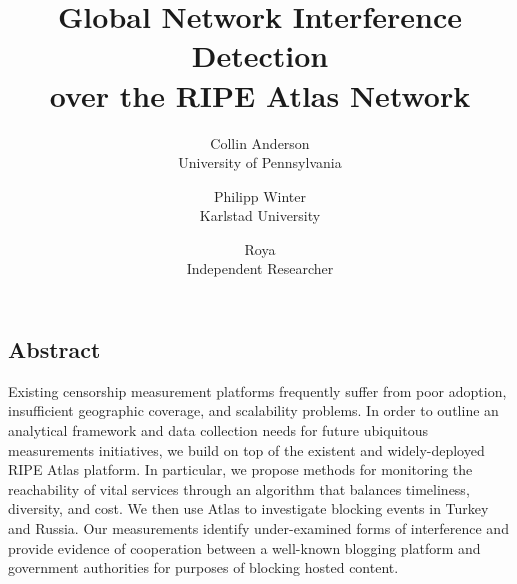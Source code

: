 \documentclass[letterpaper,twocolumn,10pt]{article}
\begin{document}
\date{}

\title{
	\Large \bf Global Network Interference Detection \\
	over the RIPE Atlas Network
}

\author{
	{\rm Collin Anderson} \\
	University of Pennsylvania
	\and
	{\rm Philipp Winter} \\
	Karlstad University
	\and
	{\rm Roya} \\
	Independent Researcher
}

\maketitle

\thispagestyle{empty}

\subsection*{Abstract}

Existing censorship measurement platforms frequently suffer from poor
adoption, insufficient geographic coverage, and scalability problems. In
order to outline an analytical framework and data collection needs for
future ubiquitous measurements initiatives, we build on top of the
existent and widely-deployed RIPE Atlas platform. In particular, we
propose methods for monitoring the reachability of vital services
through an algorithm that balances timeliness, diversity, and cost.  We
then use Atlas to investigate blocking events in Turkey and Russia. Our
measurements identify under-examined forms of interference and provide
evidence of cooperation between a well-known blogging platform and
government authorities for purposes of blocking hosted content.













\raggedright
\printbibliography
\end{document}

